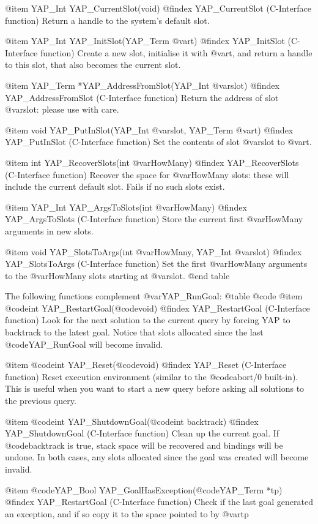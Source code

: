 {{{{{{{{@item YAP_Int YAP_CurrentSlot(void)
@findex YAP_CurrentSlot (C-Interface function)
Return a handle to the system's default slot.

@item YAP_Int YAP_InitSlot(YAP_Term @var{t})
@findex YAP_InitSlot (C-Interface function)
Create a new slot, initialise it with @var{t}, and return a handle to
this slot, that also becomes the current slot.

@item YAP_Term *YAP_AddressFromSlot(YAP_Int @var{slot})
@findex YAP_AddressFromSlot (C-Interface function)
Return the address of slot @var{slot}: please use with care.

@item void YAP_PutInSlot(YAP_Int @var{slot}, YAP_Term @var{t})
@findex YAP_PutInSlot (C-Interface function)
Set the contents of slot @var{slot} to @var{t}.

@item int YAP_RecoverSlots(int @var{HowMany})
@findex YAP_RecoverSlots (C-Interface function)
Recover the space for @var{HowMany} slots: these will include the
current default slot. Fails if no such slots exist.

@item YAP_Int YAP_ArgsToSlots(int @var{HowMany})
@findex YAP_ArgsToSlots (C-Interface function)
Store the current first  @var{HowMany} arguments in new slots.

@item void YAP_SlotsToArgs(int @var{HowMany}, YAP_Int @var{slot})
@findex YAP_SlotsToArgs (C-Interface function)
Set the first @var{HowMany} arguments to the @var{HowMany} slots
starting at @var{slot}.
@end table

The following functions complement @var{YAP_RunGoal}:
@table @code
@item  @code{int} YAP_RestartGoal(@code{void})
@findex YAP_RestartGoal (C-Interface function)
Look for the next solution to the current query by forcing YAP to
backtrack to the latest goal. Notice that slots allocated since the last
@code{YAP_RunGoal} will become invalid.

@item  @code{int} YAP_Reset(@code{void})
@findex YAP_Reset (C-Interface function)
Reset execution environment (similar to the @code{abort/0}
built-in). This is useful when you want to start a new query before
asking all solutions to the previous query.

@item  @code{int} YAP_ShutdownGoal(@code{int backtrack})
@findex YAP_ShutdownGoal (C-Interface function)
Clean up the current goal. If
@code{backtrack} is true, stack space will be recovered and bindings
will be undone. In both cases, any slots allocated since the goal was
created will become invalid.

@item  @code{YAP_Bool} YAP_GoalHasException(@code{YAP_Term *tp})
@findex YAP_RestartGoal (C-Interface function)
Check if the last goal generated an exception, and if so copy it to the
space pointed to by @var{tp}

}}}}}}}}
